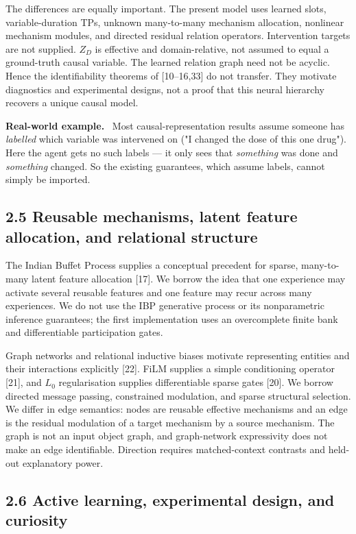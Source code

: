 \documentclass[11pt]{article}
\newenvironment{example}{%
  \par\smallskip\noindent\begin{minipage}{\textwidth}%
  \color{teal!60!black}\small
  \textbf{\color{teal!70!black}Real-world example.}\
}{%
  \end{minipage}\par\smallskip}
\begin{document}
The differences are equally important. The present model uses learned slots, variable-duration TPs, unknown many-to-many mechanism
allocation, nonlinear mechanism modules, and directed residual relation operators. Intervention targets are not supplied. $Z_D$ is
effective and domain-relative, not assumed to equal a ground-truth causal variable. The learned relation graph need not be acyclic.
Hence the identifiability theorems of [10--16,33] do not transfer. They motivate diagnostics and experimental designs, not a proof
that this neural hierarchy recovers a unique causal model.

\begin{example}
Most causal-representation results assume someone has \emph{labelled} which variable was intervened on ("I changed the dose of
this one drug"). Here the agent gets no such labels --- it only sees that \emph{something} was done and \emph{something} changed. So
the existing guarantees, which assume labels, cannot simply be imported.
\end{example}

\subsection*{2.5 Reusable mechanisms, latent feature allocation, and relational structure}

The Indian Buffet Process supplies a conceptual precedent for sparse, many-to-many latent feature allocation [17]. We borrow the
idea that one experience may activate several reusable features and one feature may recur across many experiences. We do not use the
IBP generative process or its nonparametric inference guarantees; the first implementation uses an overcomplete finite bank and
differentiable participation gates.

Graph networks and relational inductive biases motivate representing entities and their interactions explicitly [22]. FiLM supplies
a simple conditioning operator [21], and $L_0$ regularisation supplies differentiable sparse gates [20]. We borrow directed message
passing, constrained modulation, and sparse structural selection. We differ in edge semantics: nodes are reusable effective
mechanisms and an edge is the residual modulation of a target mechanism by a source mechanism. The graph is not an input object
graph, and graph-network expressivity does not make an edge identifiable. Direction requires matched-context contrasts and held-out
explanatory power.

\subsection*{2.6 Active learning, experimental design, and curiosity}
\end{document}
